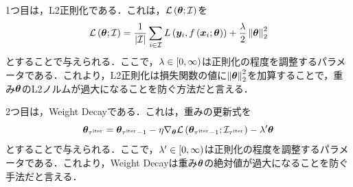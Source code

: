 1つ目は，L2正則化である．これは，$\mathcal{L}\left(\bm{\theta}; \mathcal{I}\right)$を
\begin{equation}
    \label{sec3:eq:l2_reg}
    \mathcal{L}\left(\bm{\theta}; \mathcal{I}\right) = \frac{1}{|\mathcal{I}|} \sum_{i \in \mathcal{I}} L\left(\bm{y}_{i}, f\left(\bm{x}_{i}; \bm{\theta}\right)\right) + \frac{\lambda}{2} \left\|\bm{\theta}\right\|_{2}^{2}
\end{equation}
とすることで与えられる．ここで，$\lambda \in \left[0, \infty\right)$は正則化の程度を調整するパラメータである．これより，L2正則化は損失関数の値に$\left\|\bm{\theta}\right\|_{2}^{2}$を加算することで，重み$\bm{\theta}$のL2ノルムが過大になることを防ぐ方法だと言える．

2つ目は，Weight Decayである．これは，重みの更新式を
\begin{equation}
    \label{sec3:eq:weight_decay}
    \bm{\theta}_{\tau^{\text{iter}}} = \bm{\theta}_{\tau^{\text{iter}} - 1} - \eta \nabla_{\bm{\theta}} \mathcal{L}\left(\bm{\theta}_{\tau^{\text{iter}} - 1}; \mathcal{I}_{\tau^{\text{iter}}}\right) - \lambda' \bm{\theta}
\end{equation}
とすることで与えられる．ここで，$\lambda' \in \left[0, \infty\right)$は正則化の程度を調整するパラメータである．これより，Weight Decayは重み$\bm{\theta}$の絶対値が過大になることを防ぐ手法だと言える．

